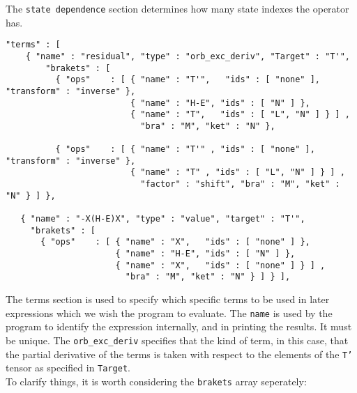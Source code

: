 The \texttt{state dependence} section determines how many state indexes 
the operator has.
\begin{lstlisting}[label={lst:terms}]
  "terms" : [
    { "name" : "residual", "type" : "orb_exc_deriv", "Target" : "T'",
        "brakets" : [
          { "ops"    : [ { "name" : "T'",   "ids" : [ "none" ], "transform" : "inverse" },
                         { "name" : "H-E", "ids" : [ "N" ] },
                         { "name" : "T",   "ids" : [ "L", "N" ] } ] ,
                           "bra" : "M", "ket" : "N" }, 

          { "ops"    : [ { "name" : "T'" , "ids" : [ "none" ], "transform" : "inverse" },
                         { "name" : "T" , "ids" : [ "L", "N" ] } ] ,
                           "factor" : "shift", "bra" : "M", "ket" : "N" } ] },

   { "name" : "-X(H-E)X", "type" : "value", "target" : "T'",
     "brakets" : [
       { "ops"    : [ { "name" : "X",   "ids" : [ "none" ] },
                      { "name" : "H-E", "ids" : [ "N" ] },
                      { "name" : "X",   "ids" : [ "none" ] } ] ,
                        "bra" : "M", "ket" : "N" } ] } ],
\end{lstlisting}         
The terms section is used to specify which specific terms to be used in later expressions
which we wish the program to evaluate.  The \texttt{name} is used by the program to
identify the expression internally, and in printing the results. It must be unique. 
The \texttt{orb\_exc\_deriv} specifies that the kind of term, in this case, that the partial
derivative of the terms is taken with respect to the elements of the
\texttt{T'} tensor as specified in \texttt{Target}.\\

\noindent To clarify things, it is worth considering the \texttt{brakets} array seperately:

